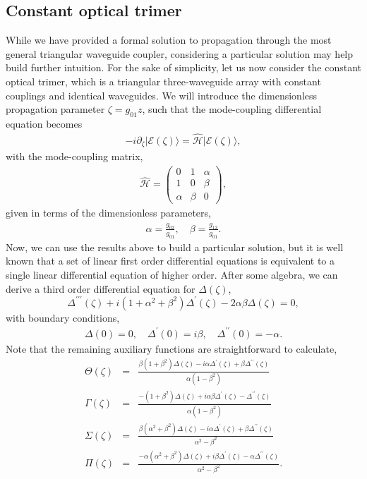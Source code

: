 \documentclass[9pt,twocolumn,twoside]{osajnl}
\begin{document}
\subsection{Constant optical trimer}
While we have provided a formal solution to propagation through the most general triangular waveguide coupler, considering a particular solution may help build further intuition. 
For the sake of simplicity, let us now consider the constant optical trimer, which is a triangular three-waveguide array with constant couplings and identical waveguides. 
We will introduce the dimensionless propagation parameter $\zeta = g_{01} z$, such that the mode-coupling differential equation becomes 
\begin{eqnarray}
- i \partial_{\zeta} \vert \mathcal{E}(\zeta) \rangle = \hat{\mathcal{H}} \vert \mathcal{E}(\zeta) \rangle, 
\end{eqnarray}
with the mode-coupling matrix,
\begin{eqnarray}
\hat{\mathcal{H}} = \left( \begin{array}{ccc} 
0  & 1 & \alpha  \\
1 & 0 & \beta \\
\alpha & \beta & 0
\end{array} \right), \label{eq:hmlt2}
\end{eqnarray}
given in terms of the dimensionless parameters,
\begin{eqnarray}
\alpha =\frac{g_{02}}{g_{01}}, \quad \beta=\frac{g_{12}}{g_{01}}.
\end{eqnarray}
Now, we can use the results above to build a particular solution, but it is well known that a set of linear first order differential equations is equivalent to a single linear differential equation of higher order.
After some algebra, we can derive a third order differential equation for $\Delta(\zeta)$,
\begin{equation}
\Delta^{\prime\prime\prime}(\zeta) + i(1+\alpha^2+\beta^2)\Delta ^{\prime}(\zeta) -2 \alpha\beta\Delta(\zeta) = 0,\label{eq:ddiff}
\end{equation}
with boundary conditions, 
\begin{eqnarray}
\Delta(0) = 0, \quad \Delta^{\prime}(0) = i\beta, \quad \Delta^{\prime\prime}(0) = -\alpha.
\end{eqnarray}
Note that the remaining auxiliary functions are straightforward to calculate, 
\begin{eqnarray}
\Theta(\zeta)&=& \frac{\beta(1+\beta^2)\Delta(\zeta) - i \alpha\Delta^{\prime}(\zeta)+\beta\Delta^{\prime\prime}(\zeta)}
	{\alpha(1-\beta^2)}  \\
\Gamma(\zeta)&=& \frac{-(1+\beta^2)\Delta(\zeta) +i \alpha\beta\Delta^{\prime}(\zeta)-\Delta^{\prime\prime}(\zeta)}
	{\alpha(1-\beta^2)} \\
\Sigma(\zeta)&=& \frac{\beta(\alpha^2+\beta^2)\Delta(\zeta) -i \alpha\Delta^{\prime}(\zeta)+\beta\Delta^{\prime\prime}(\zeta)}
	{\alpha^2-\beta^2}  \\
\Pi(\zeta)&=& \frac{-\alpha(\alpha^2+\beta^2)\Delta(\zeta) +i \beta\Delta^{\prime}(\zeta)-\alpha\Delta^{\prime\prime}(\zeta)}
	{\alpha^2-\beta^2}.
\end{eqnarray} 
\end{document}
